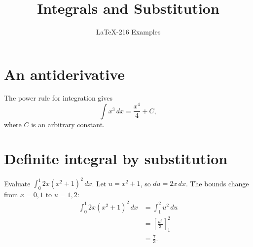 \documentclass{article}
\title{Integrals and Substitution}
\author{LaTeX-216 Examples}
\date{}
\begin{document}
\maketitle

\section{An antiderivative}
The power rule for integration gives
\[
  \int x^3\,dx = \frac{x^4}{4}+C,
\]
where $C$ is an arbitrary constant.

\section{Definite integral by substitution}
Evaluate $\int_0^1 2x(x^2+1)^2\,dx$. Let $u=x^2+1$, so $du=2x\,dx$.
The bounds change from $x=0,1$ to $u=1,2$:
\begin{align*}
  \int_0^1 2x(x^2+1)^2\,dx
    &= \int_1^2 u^2\,du \\
    &= \left[\frac{u^3}{3}\right]_1^2 \\
    &= \frac{7}{3}.
\end{align*}
\end{document}
